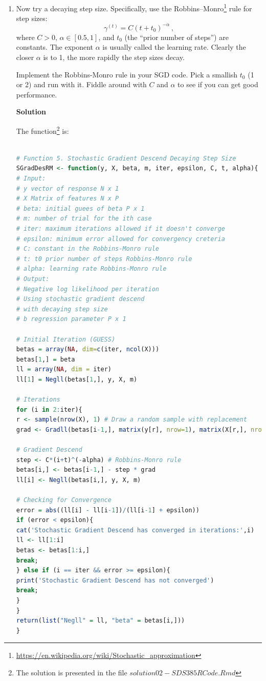 \documentclass[11 pt]{article}
\begin{document}
\begin{enumerate}[label=(\Alph*)]
	\item Now try a decaying step size.  Specifically, use the Robbins--Monro\footnote{\url{https://en.wikipedia.org/wiki/Stochastic_approximation}} rule for step sizes: 
	$$
	\gamma^{(t)} = C (t + t_0)^{-\alpha} \, ,
	$$
	where $C > 0$, $\alpha \in [0.5, 1]$, and $t_0$ (the ``prior number of steps'') are constants.  The exponent $\alpha$ is usually called the learning rate.  Clearly the closer $\alpha$ is to 1, the more rapidly the step sizes decay.
	
	Implement the Robbins-Monro rule in your SGD code. Pick a smallish $t_0$ (1 or 2) and run with it.   Fiddle around with $C$ and $\alpha$ to see if you can get good performance. 
	
	\vspace{2mm}
	\textbf{Solution}
	
	The function\footnote{The solution is presented in the file $solution02-SDS385 RCode.Rmd$} is:
	
	\begin{lstlisting}[language=R]

# Function 5. Stochastic Gradient Descend Decaying Step Size
SGradDesRM <- function(y, X, beta, m, iter, epsilon, C, t, alpha){
# Input:
# y vector of response N x 1
# X Matrix of features N x P
# beta: initial guees of beta P x 1
# m: number of trial for the ith case
# iter: maximum iterations allowed if it doesn't converge
# epsilon: minimum error allowed for convergency creteria
# C: constant in the Robbins-Monro rule
# t: t0 prior number of steps Robbins-Monro rule
# alpha: learning rate Robbins-Monro rule
# Output:
# Negative log likelihood per iteration
# Using stochastic gradient descend
# with decaying step size
# b regression parameter P x 1

# Initial Iteration (GUESS)
betas = array(NA, dim=c(iter, ncol(X)))
betas[1,] = beta
ll = array(NA, dim = iter)
ll[1] = Negll(betas[1,], y, X, m)

# Iterations
for (i in 2:iter){
r <- sample(nrow(X), 1) # Draw a random sample with replacement
grad <- Gradll(betas[i-1,], matrix(y[r], nrow=1), matrix(X[r,], nrow=1), m)

# Gradient Descend
step <- C*(i+t)^(-alpha) # Robbins-Monro rule
betas[i,] <- betas[i-1,] - step * grad 
ll[i] <- Negll(betas[i,], y, X, m)

# Checking for Convergence
error = abs((ll[i] - ll[i-1])/(ll[i-1] + epsilon))
if (error < epsilon){
cat('Stochastic Gradient Descend has converged in iterations:',i)
ll <- ll[1:i]
betas <- betas[1:i,]
break;
} else if (i == iter && error >= epsilon){
print('Stochastic Gradient Descend has not converged')
break;
}
}
return(list("Negll" = ll, "beta" = betas[i,]))
}	


\end{lstlisting}
\end{enumerate}
\end{document}

